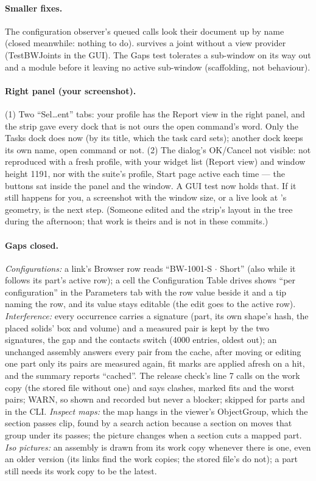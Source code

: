 \paragraph{Smaller fixes.} The configuration observer's queued calls look their document up by name (closed
meanwhile: nothing to do).  survives a joint without a view provider (TestBWJoints
in the GUI). The Gaps test tolerates a sub-window on its way out and a module before it leaving no active
sub-window (scaffolding, not behaviour).

\paragraph{Right panel (your screenshot).} (1) Two ``Sel\ldots ent'' tabs: your profile has the Report view in the
right panel, and the strip gave every dock that is not ours the open command's word. Only the Tasks dock does now
(by its title, which the task card sets); another dock keeps its own name, open command or not. (2) The dialog's
OK/Cancel not visible: not reproduced with a fresh profile, with your widget list (Report view) and window height
1191, nor with the suite's profile, Start page active each time --- the buttons sat inside the panel and the
window. A GUI test now holds that. If it still happens for you, a screenshot with the window size, or a live look
at 's geometry, is the next step. (Someone edited  and the strip's
layout in the tree during the afternoon; that work is theirs and is not in these commits.)

\paragraph{Gaps closed.} \emph{Configurations:} a link's Browser row reads ``BW-1001-S $\cdot$ Short'' (also while
it follows its part's active row); a cell the Configuration Table drives shows ``per configuration'' in the
Parameters tab with the row value beside it and a tip naming the row, and its value stays editable (the edit goes to
the active row). \emph{Interference:} every occurrence carries a signature (part, its own shape's hash, the placed
solids' box and volume) and a measured pair is kept by the two signatures, the gap and the contacts switch (4000
entries, oldest out); an unchanged assembly answers every pair from the cache, after moving or editing one part only
its pairs are measured again, fit marks are applied afresh on a hit, and the summary reports ``cached''. The release
check's line 7 calls  on the work copy (the stored file without one) and says clashes, marked fits
and the worst pairs; WARN, so shown and recorded but never a blocker; skipped for parts and in the CLI.
\emph{Inspect maps:} the map hangs in the viewer's ObjectGroup, which the section passes clip, found by a search
action because a section on moves that group under its passes; the picture changes when a section cuts a mapped
part. \emph{Iso pictures:} an assembly is drawn from its work copy whenever there is one, even an older version
(its links find the work copies; the stored file's do not); a part still needs its work copy to be the latest.

